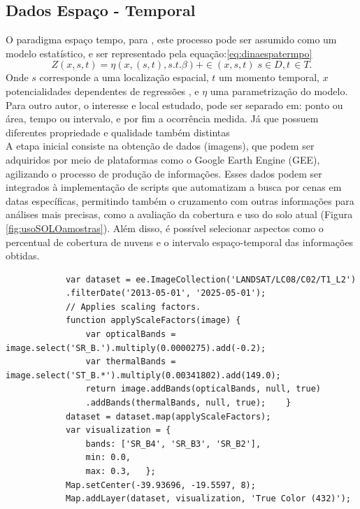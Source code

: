 		\subsection{Dados Espaço - Temporal} 
		
		\hspace*{1.25 cm} O paradigma espaço tempo, para \cite[p.2]{mateu}, este processo pode ser assumido como um modelo estatístico, e ser representado pela equação:\eqref{eq:dinaespatermpo}
		\begin{equation}\label{eq:dinaespatermpo}
			Z(x,s,t) =  \eta ( x,(s,t), s.t.\beta) + \in (x,s,t)  \; s \in D, t \, \in T.  
		\end{equation}
		\hspace*{1.25 cm}   Onde $s$ corresponde a uma localização espacial, $t$ um momento temporal, $x$ potencialidades  dependentes de regressões , e $ \eta $ uma parametrização do modelo.\\
		\hspace*{1.25 cm} Para outro autor,  \cite[p.151]{Bivand} o interesse e local estudado, pode ser separado em: ponto ou área, tempo ou intervalo, e por fim a ocorrência medida. Já que possuem diferentes  propriedade e qualidade também distintas  \\
		\hspace*{1.25 cm} A etapa inicial consiste na obtenção de dados (imagens), que podem ser adquiridos por meio de plataformas como o Google Earth Engine (GEE), agilizando o processo de produção de informações. Esses dados podem ser integrados à implementação de scripts que automatizam a busca por cenas em datas específicas, permitindo também o cruzamento com outras informações para análises mais precisas, como a avaliação da cobertura e uso do solo atual (Figura \ref{fig:usoSOLOamostras}). Além disso, é possível selecionar aspectos como o percentual de cobertura de nuvens e o intervalo espaço-temporal das informações obtidas.
	
		\lstset{
			language=Java, %
			caption=Código de obtenção de imagens multiespectrais Landsat8 plataforma Google Earth Engine Code\, em linguagem JavaScript.,} %
		
		\begin{lstlisting}
			var dataset = ee.ImageCollection('LANDSAT/LC08/C02/T1_L2')
			.filterDate('2013-05-01', '2025-05-01');
			// Applies scaling factors.
			function applyScaleFactors(image) {
				var opticalBands = image.select('SR_B.').multiply(0.0000275).add(-0.2);
				var thermalBands = image.select('ST_B.*').multiply(0.00341802).add(149.0);
				return image.addBands(opticalBands, null, true)
				.addBands(thermalBands, null, true);   	}
			dataset = dataset.map(applyScaleFactors);
			var visualization = {
				bands: ['SR_B4', 'SR_B3', 'SR_B2'],
				min: 0.0,
				max: 0.3,  	};
			Map.setCenter(-39.93696, -19.5597, 8);
			Map.addLayer(dataset, visualization, 'True Color (432)');
		\end{lstlisting}
